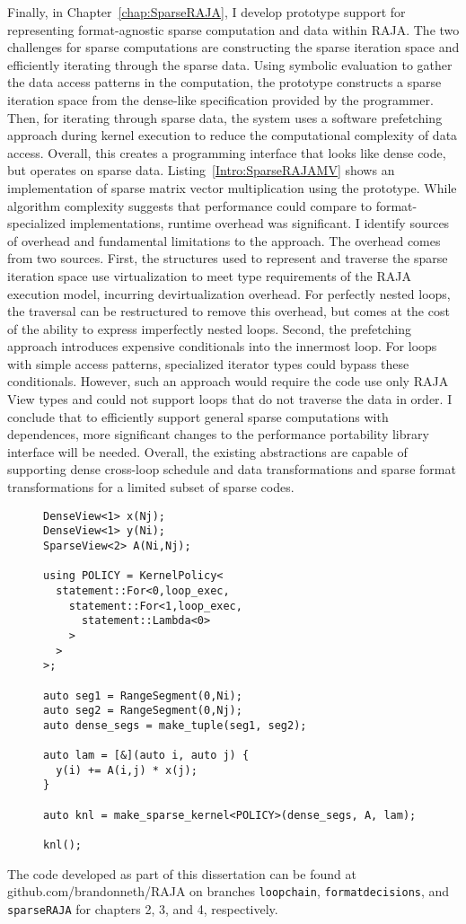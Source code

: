 Finally, in Chapter~\ref{chap:SparseRAJA}, I develop prototype support for representing format-agnostic sparse computation and data within RAJA\@.
The two challenges for sparse computations are constructing the sparse iteration space and efficiently iterating through the sparse data.
Using symbolic evaluation to gather the data access patterns in the computation, the prototype constructs a sparse iteration space from the dense-like specification provided by the programmer.
Then, for iterating through sparse data, the system uses a software prefetching approach during kernel execution to reduce the computational complexity of data access.
Overall, this creates a programming interface that looks like dense code, but operates on sparse data.
Listing~\ref{Intro:SparseRAJAMV} shows an implementation of sparse matrix vector multiplication using the prototype.
While algorithm complexity suggests that performance could compare to format-specialized implementations, runtime overhead was significant.
I identify sources of overhead and fundamental limitations to the approach.
The overhead comes from two sources.
First, the structures used to represent and traverse the sparse iteration space use virtualization to meet type requirements of the RAJA execution model, incurring devirtualization overhead.
For perfectly nested loops, the traversal can be restructured to remove this overhead, but comes at the cost of the ability to express imperfectly nested loops.
Second, the prefetching approach introduces expensive conditionals into the innermost loop.
For loops with simple access patterns, specialized iterator types could bypass these conditionals.
However, such an approach would require the code use only RAJA View types and could not support loops that do not traverse the data in order.
I conclude that to efficiently support general sparse computations with dependences, more significant changes to the performance portability library interface will be needed.
Overall, the existing abstractions are capable of supporting dense cross-loop schedule and data transformations and sparse format transformations for a limited subset of sparse codes.

\begin{figure}
\begin{lstlisting}[caption={Implementation of SpMV using the SparseRAJA prototype},label=Intro:SparseRAJAMV]
DenseView<1> x(Nj);
DenseView<1> y(Ni);
SparseView<2> A(Ni,Nj);

using POLICY = KernelPolicy<
  statement::For<0,loop_exec,
    statement::For<1,loop_exec,
      statement::Lambda<0>
    >
  >
>;

auto seg1 = RangeSegment(0,Ni);
auto seg2 = RangeSegment(0,Nj);
auto dense_segs = make_tuple(seg1, seg2);

auto lam = [&](auto i, auto j) {
  y(i) += A(i,j) * x(j);
}

auto knl = make_sparse_kernel<POLICY>(dense_segs, A, lam);
  
knl();
\end{lstlisting}
\end{figure}

The code developed as part of this dissertation can be found at github.com/brandonneth/RAJA on branches \verb.loopchain., \verb.formatdecisions., and \verb.sparseRAJA. for chapters 2, 3, and 4, respectively.
